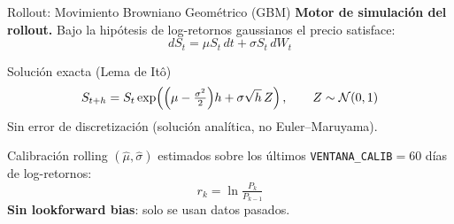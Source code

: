 \documentclass[aspectratio=169, 10pt]{beamer}
\begin{document}
\begin{frame}{Rollout: Movimiento Browniano Geométrico (GBM)}
  \textbf{Motor de simulación del rollout.}
  Bajo la hipótesis de log-retornos gaussianos el precio satisface:
  \[
    dS_t = \mu S_t\,dt + \sigma S_t\,dW_t
  \]

  \begin{block}{Solución exacta (Lema de Itô)}
    \[
      S_{t+h} = S_t\exp\!\left(
        \Bigl(\mu - \tfrac{\sigma^2}{2}\Bigr)h
        + \sigma\sqrt{h}\,Z
      \right), \qquad Z\sim\mathcal{N}(0,1)
    \]
    Sin error de discretización (solución analítica, no Euler–Maruyama).
  \end{block}
  
        \begin{exampleblock}{Calibración rolling}
        $(\hat\mu,\hat\sigma)$ estimados sobre los últimos
        \texttt{VENTANA\_CALIB}$=60$ días de log-retornos:
        \[
          r_k = \ln\!\tfrac{P_k}{P_{k-1}}
        \]
        \textbf{Sin lookforward bias}: solo se usan datos pasados.
      \end{exampleblock}
\end{frame}

\end{document}

